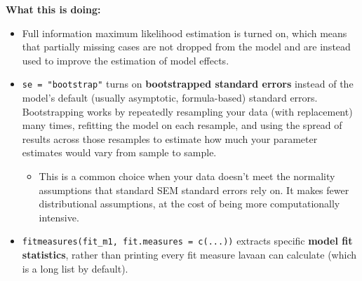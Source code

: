\documentclass[
  letterpaper,
  DIV=11,
  numbers=noendperiod]{scrreprt}
\providecommand{\tightlist}{%
  \setlength{\itemsep}{0pt}\setlength{\parskip}{0pt}}\usepackage{longtable,booktabs,array}
\begin{document}
\textbf{What this is doing:}

\begin{itemize}
\item
  Full information maximum likelihood estimation is turned on, which
  means that partially missing cases are not dropped from the model and
  are instead used to improve the estimation of model effects.
\item
  \texttt{se\ =\ "bootstrap"} turns on \textbf{bootstrapped standard
  errors} instead of the model's default (usually asymptotic,
  formula-based) standard errors. Bootstrapping works by repeatedly
  resampling your data (with replacement) many times, refitting the
  model on each resample, and using the spread of results across those
  resamples to estimate how much your parameter estimates would vary
  from sample to sample.

  \begin{itemize}
  \tightlist
  \item
    This is a common choice when your data doesn't meet the normality
    assumptions that standard SEM standard errors rely on. It makes
    fewer distributional assumptions, at the cost of being more
    computationally intensive.
  \end{itemize}
\item
  \texttt{fitmeasures(fit\_m1,\ fit.measures\ =\ c(...))} extracts
  specific \textbf{model fit statistics}, rather than printing every fit
  measure lavaan can calculate (which is a long list by default).


\end{itemize}
\end{document}
